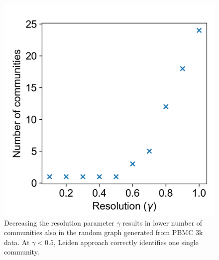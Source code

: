 \documentclass[11pt, titlepage, twoside]{article}
\begin{document}
\begin{figure}[htbp]
\centering
\includegraphics[keepaspectratio,width=\textwidth,height=0.375\textheight]{Random_Leiden_by_gamma.png}
\caption[]{Decreasing the resolution parameter $\gamma$ results in lower number of communities also in the random graph generated from PBMC 3k data. At $\gamma < 0.5$, Leiden approach correctly identifies one single community.}
\label{Modularity_Random_Res}
\end{figure}
\clearpage


\end{document}
